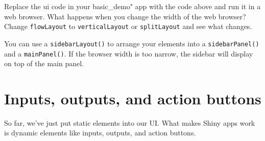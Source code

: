 \documentclass[
]{book}
\newenvironment{Shaded}{\begin{snugshade}}{\end{snugshade}}
\newcommand{\AttributeTok}[1]{\textcolor[rgb]{0.77,0.63,0.00}{#1}}
\newcommand{\FunctionTok}[1]{\textcolor[rgb]{0.00,0.00,0.00}{#1}}
\newcommand{\NormalTok}[1]{#1}
\newcommand{\OtherTok}[1]{\textcolor[rgb]{0.56,0.35,0.01}{#1}}
\newcommand{\SpecialCharTok}[1]{\textcolor[rgb]{0.00,0.00,0.00}{#1}}
\newcommand{\StringTok}[1]{\textcolor[rgb]{0.31,0.60,0.02}{#1}}
\begin{document}
Replace the ui code in your basic\_demo" app with the code above and run it in a web browser. What happens when you change the width of the web browser? Change \texttt{flowLayout} to \texttt{verticalLayout} or \texttt{splitLayout} and see what changes.

You can use a \texttt{sidebarLayout()} to arrange your elements into a \texttt{sidebarPanel()} and a \texttt{mainPanel()}. If the browser width is too narrow, the sidebar will display on top of the main panel.

\begin{Shaded}
\end{Shaded}

\hypertarget{inputs-outputs-and-action-buttons}{%
\section{Inputs, outputs, and action buttons}\label{inputs-outputs-and-action-buttons}}

So far, we've just put static elements into our UI. What makes Shiny apps work is dynamic elements like inputs, outputs, and action buttons.
\end{document}
